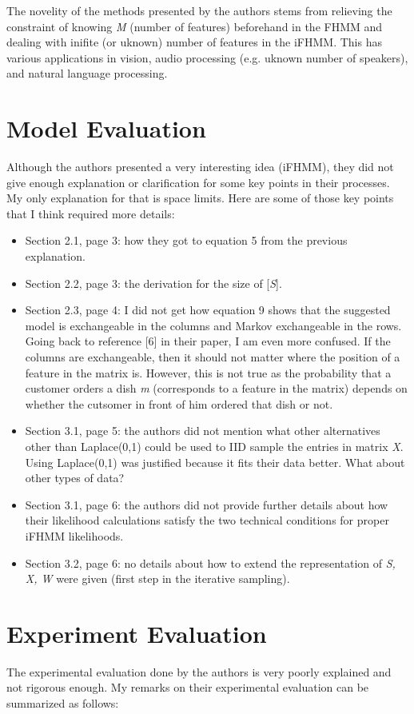 \documentclass[10pt,a4paper]{article}
\begin{document}
The novelity of the methods presented by the authors stems from relieving the constraint of knowing \textit{M} (number of features) beforehand in the FHMM and
dealing with inifite (or uknown) number of features in the iFHMM. This has various applications in vision, audio processing (e.g. uknown number of speakers),
and natural language processing.

\section{Model Evaluation}
Although the authors presented a very interesting idea (iFHMM), they did not give enough explanation or clarification for some key points in their processes.
My only explanation for that is space limits. Here are some of those key points that I think required more details:

\begin{itemize}
 \item Section 2.1, page 3: how they got to equation 5 from the previous explanation.
 \item Section 2.2, page 3: the derivation for the size of [\textit{S}].
 \item Section 2.3, page 4: I did not get how equation 9 shows that the suggested model is exchangeable in the columns and Markov exchangeable in the rows.
Going back to reference [6] in their paper, I am even more confused. If the columns are exchangeable, then it should not matter where the position of a feature
in the matrix is. However, this is not true as the probability that a customer orders a dish \textit{m} (corresponds to a feature in the matrix) depends on
whether the cutsomer in front of him ordered that dish or not.
 \item Section 3.1, page 5: the authors did not mention what other alternatives other than Laplace(0,1) could be used to IID sample the entries in matrix
\textit{X}. Using Laplace(0,1) was justified because it fits their data better. What about other types of data?
 \item Section 3.1, page 6: the authors did not provide further details about how their likelihood calculations satisfy the two technical conditions for proper
iFHMM likelihoods.
 \item Section 3.2, page 6: no details about how to extend the representation of \textit{S, X, W} were given (first step in the iterative sampling).
\end{itemize}

\section{Experiment Evaluation}
The experimental evaluation done by the authors is very poorly explained and not rigorous enough. My remarks on their experimental evaluation can be summarized
as follows:
\end{document}
